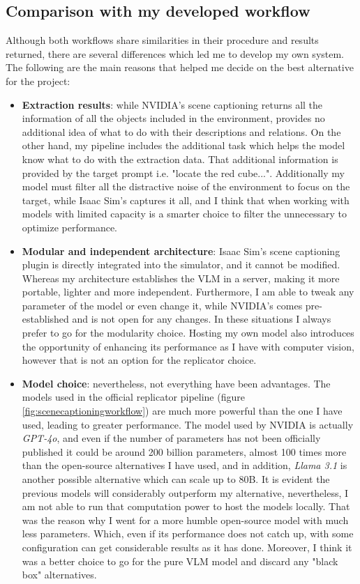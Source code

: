 \subsection{Comparison with my developed workflow}
Although both workflows share similarities in their procedure and results returned, there are several differences which led me to develop my own system. The following are the main reasons that helped me decide on the best alternative for the project: 

\begin{itemize}
	\item \textbf{Extraction results}: while NVIDIA's scene captioning returns all the information of all the objects included in the environment, provides no additional idea of what to do with their descriptions and relations. On the other hand, my pipeline includes the additional task which helps the model know what to do with the extraction data. That additional information is provided by the target prompt i.e. "locate the red cube...". Additionally my model must filter all the distractive noise of the environment to focus on the target, while Isaac Sim's captures it all, and I think that when working with models with limited capacity is a smarter choice to filter the unnecessary to optimize performance. 
	
	\item \textbf{Modular and independent architecture}: Isaac Sim's scene captioning plugin is directly integrated into the simulator, and it cannot be modified. Whereas my architecture establishes the VLM in a server, making it more portable, lighter and more independent. Furthermore, I am able to tweak any parameter of the model or even change it, while NVIDIA's comes pre-established and is not open for any changes. In these situations I always prefer to go for the modularity choice. Hosting my own model also introduces the opportunity of enhancing its performance as I have with computer vision, however that is not an option for the replicator choice.
	
	\item \textbf{Model choice}: nevertheless, not everything have been advantages. The models used in the official replicator pipeline (figure \ref{fig:scenecaptioningworkflow}) are much more powerful than the one I have used, leading to greater performance. The model used by NVIDIA is actually \textit{GPT-4o}, and even if the number of parameters has not been officially published it could be around 200 billion parameters, almost 100 times more than the open-source alternatives I have used, and in addition, \textit{Llama 3.1} is another possible alternative which can scale up to 80B. It is evident the previous models will considerably outperform my alternative, nevertheless, I am not able to run that computation power to host the models locally. That was the reason why I went for a more humble open-source model with much less parameters. Which, even if its performance does not catch up, with some configuration can get considerable results as it has done. Moreover, I think it was a better choice to go for the pure VLM model and discard any "black box" alternatives. 
\end{itemize}

